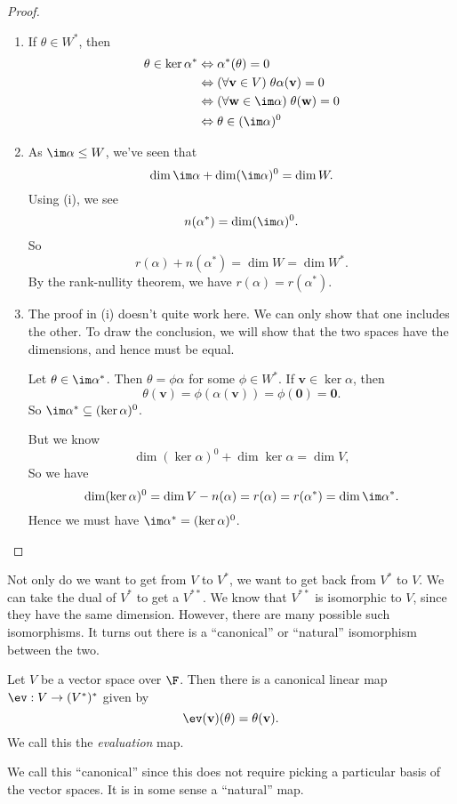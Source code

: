 \documentclass[a4paper]{article}
\begin{document}
\begin{proof}\leavevmode
  \begin{enumerate}
    \item If $\theta \in W^*$, then
      \begin{align*}
        \theta \in \ker \alpha^* &\Leftrightarrow \alpha^*(\theta) = 0 \\
        &\Leftrightarrow (\forall \mathbf{v}\in V)\; \theta \alpha(\mathbf{v}) = 0 \\
        &\Leftrightarrow (\forall \mathbf{w}\in \im \alpha)\; \theta(\mathbf{w}) = 0\\
        &\Leftrightarrow \theta \in (\im \alpha)^0
      \end{align*}
    \item As $\im \alpha \leq W$, we've seen that
      \[
        \dim \im \alpha + \dim (\im \alpha)^0 = \dim W.
      \]
      Using (i), we see
      \[
        n(\alpha^*) = \dim (\im \alpha)^0.
      \]
      So
      \[
        r(\alpha) + n(\alpha^*) = \dim W = \dim W^*.
      \]
      By the rank-nullity theorem, we have $r(\alpha) = r(\alpha^*)$.
    \item The proof in (i) doesn't quite work here. We can only show that one includes the other. To draw the conclusion, we will show that the two spaces have the dimensions, and hence must be equal.

      Let $\theta \in \im \alpha^*$. Then $\theta = \phi \alpha$ for some $\phi \in W^*$. If $\mathbf{v}\in \ker\alpha$, then
      \[
        \theta(\mathbf{v}) = \phi(\alpha(\mathbf{v})) = \phi(\mathbf{0}) = \mathbf{0}.
      \]
      So $\im \alpha^* \subseteq (\ker\alpha)^0$.

      But we know
      \[
        \dim (\ker \alpha)^0 + \dim \ker \alpha = \dim V,
      \]
      So we have
      \[
        \dim (\ker \alpha)^0 = \dim V - n(\alpha) = r(\alpha) = r(\alpha^*) = \dim \im \alpha^*.
      \]
      Hence we must have $\im \alpha^* = (\ker \alpha)^0$.
  \end{enumerate}
\end{proof}

Not only do we want to get from $V$ to $V^*$, we want to get back from $V^*$ to $V$. We can take the dual of $V^*$ to get a $V^{**}$. We know that $V^{**}$ is isomorphic to $V$, since they have the same dimension. However, there are many possible such isomorphisms. It turns out there is a ``canonical'' or ``natural'' isomorphism between the two.

\begin{lemma}
  Let $V$ be a vector space over $\F$. Then there is a canonical linear map $\ev: V\to (V^*)^*$ given by
  \[
    \ev (\mathbf{v})(\theta) = \theta(\mathbf{v}).
  \]
  We call this the \emph{evaluation} map.
\end{lemma}
We call this ``canonical'' since this does not require picking a particular basis of the vector spaces. It is in some sense a ``natural'' map.
\end{document}
